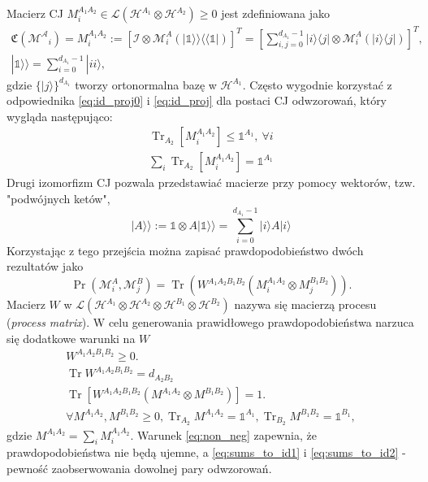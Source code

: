\documentclass[10pt]{article} %
\DeclareMathOperator{\Trs}{Tr}
\newcommand{\Mats}[1]{\mathcal{L}(#1)}
\newcommand{\Hx}[1]{\mathcal{H}^{#1}}
\newcommand{\HAi}{\Hx{A_1}}
\newcommand{\MXi}[3]{\mathcal{M}^{#1}_{#2}(#3)}
\newcommand{\MXin}[2]{\mathcal{M}^{#1}_{#2}}
\newcommand{\MAin}[0]{\MXin{A}{i}}
\newcommand{\MAi}[1]{\MXi{A}{i}{#1}}
\newcommand{\Tr}[1]{\Trs(#1)}
\newcommand{\Prt}[2]{\Pr(#1, #2)}
\newcommand{\Ket}[1]{|#1\rangle}
\newcommand{\Bra}[1]{\langle#1|}
\newcommand{\BBra}[1]{\langle\langle#1|}
\newcommand{\KKet}[1]{|#1\rangle\rangle}
\newcommand{\WAll}{W^{A_1A_2B_1B_2}}
\newcommand{\MA}{M^{A_1A_2}}
\newcommand{\MB}{M^{B_1B_2}}
\newcommand{\mai}[1]{\MA_{#1}}
\newcommand{\I}{\mathbb{1}}
\newcommand{\MCJ}{\mathfrak{C}}
\begin{document}
Macierz CJ $M^{A_1A_2}_i \in \Mats{\Hx{A_1} \otimes \Hx{A_2}} \geq 0$ jest zdefiniowana jako
\begin{gather}
\label{eq:cj_iso}
\MCJ(\mathcal{M^A}_i)= M^{A_1A_2}_i := [\mathcal{I} \otimes \MAi{ \KKet{\I} \BBra{\I}}]^T= \left[\sum^{d_{A_1}-1}_{i,j=0} \Ket{i}\Bra{j} \otimes \mathcal{M}^A_i(\Ket{i}\Bra{j})\right]^T, \\
\KKet{\I} = \sum^{d_{A_1}-1}_{i=0} \Ket{ii},
\end{gather}
gdzie $\{\Ket{j}\}^{d_{A_1}}$ tworzy ortonormalna bazę w $\HAi$. 
Często wygodnie korzystać z odpowiednika \eqref{eq:id_proj0} i \eqref{eq:id_proj} dla postaci CJ odwzorowań, który wygląda następująco:
\begin{gather}
\Trs_{A_2} \left[ M^{A_1A_2}_i \right] \leq \I^{A_1},~\forall i\\ 
\sum_i \Trs_{A_2} \left[ M^{A_1A_2}_i \right] = \I^{A_1}
\end{gather}
Drugi izomorfizm CJ pozwala przedstawiać macierze przy pomocy wektorów, tzw. "podwójnych ketów",
\begin{equation}
\KKet{A} := \I \otimes A\KKet{\I} = \sum^{d_{A_1}-1}_{i=0} \Ket{i} A \Ket{i}
\end{equation}
Korzystając z tego przejścia można zapisać prawdopodobieństwo dwóch rezultatów jako 
\begin{equation}
\label{eq:cj_prob}
\Prt{\MAin}{\MXin{B}{j}} = \Tr{\WAll(M^{A_1A_2}_i \otimes M^{B_1B_2}_j)}.
\end{equation}
Macierz $W$ w $\Mats{\Hx{A_1} \otimes \Hx{A_2} \otimes \Hx{B_1} \otimes \Hx{B_2}}$ nazywa się macierzą procesu (\textit{process matrix}).
W celu generowania prawidłowego prawdopodobieństwa narzuca się dodatkowe warunki na $W$
\begin{gather}
\label{eq:non_neg}
\WAll \geq 0. \\
\label{norm}
\Trs \WAll = d_{A_2B_2} \\
\label{eq:sums_to_id1}
\Trs
\left[
\WAll
\left(
M^{A_1A_2} \otimes M^{B_1B_2}
\right)
\right]=1.\\
\label{eq:sums_to_id2}
\forall M^{A_1A_2}, M^{B_1B_2} \geq 0, \Trs_{A_2} \MA = \mathbb{1}^{A_1}, \Trs_{B_2} \MB = \mathbb{1}^{B_1},
\end{gather}
gdzie $\MA = \sum_i \mai{i}$. Warunek \eqref{eq:non_neg} zapewnia, że prawdopodobieństwa nie będą ujemne, a \eqref{eq:sums_to_id1} i  \eqref{eq:sums_to_id2} - pewność zaobserwowania dowolnej pary odwzorowań. 
\end{document}
